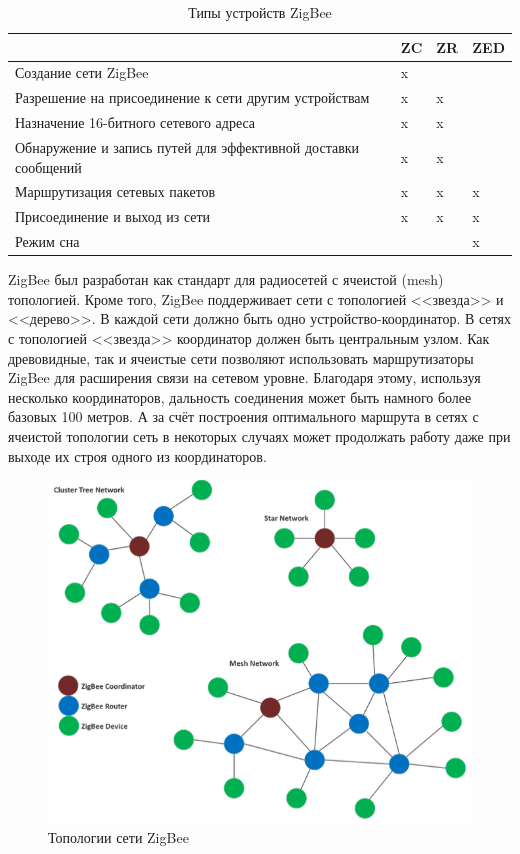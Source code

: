 	\begin{table}[h]
		\centering
		\begin{tabular}{ | p{9cm} | p{1cm} | p{1cm} | p{1cm} | }
			\hline
			& ZC & ZR & ZED \\ \hline
			Создание сети ZigBee & x &  &  \\ \hline
			Разрешение на присоединение к сети другим устройствам & x & x &  \\ \hline
			Назначение 16-битного сетевого адреса & x & x &  \\ \hline
			Обнаружение и запись путей для эффективной доставки сообщений & x & x &  \\ \hline
			Маршрутизация сетевых пакетов & x & x & x \\ \hline
			Присоединение и выход из сети & x & x & x \\ \hline
			Режим сна & & & x \\ \hline
		\end{tabular}
		\caption{Типы устройств ZigBee}
		\label{table-ZigBee-device-types}
	\end{table}
	
	ZigBee был разработан как стандарт для радиосетей с ячеистой (mesh) топологией.
	Кроме того, ZigBee поддерживает сети с топологией <<звезда>> и <<дерево>>. В каждой 
	сети должно быть одно устройство-координатор. В сетях с топологией <<звезда>> координатор должен 
	быть центральным узлом. Как древовидные, так и ячеистые сети позволяют использовать маршрутизаторы 
	ZigBee для расширения связи на сетевом уровне. Благодаря этому, используя несколько координаторов,
	дальность соединения может быть намного более базовых 100 метров. А за счёт построения оптимального
	маршрута в сетях с ячеистой топологии сеть в некоторых случаях может продолжать работу даже
	при выходе их строя одного из координаторов. \newline
	
	\begin{figure}[h]
		\centering
		\includegraphics[scale=0.6]{resources/ZigBee-network-topologies}
		\caption{Топологии сети ZigBee}
		\label{fig1.1}
	\end{figure}

